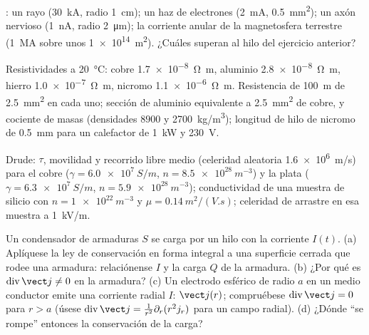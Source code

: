 \begin{exercise}[$\star$]\label{exo:b2:charges-currents-conduction:2}
: un rayo (\qty{30}{kA}, radio \qty{1}{cm}); un haz de
electrones (\qty{2}{mA}, \qty{0.5}{mm^2}); un axón nervioso (\qty{1}{nA}, radio
\qty{2}{\micro m}); la corriente anular de la magnetosfera terrestre (\qty{1}{MA} sobre
unos \qty{1e14}{m^2}). ¿Cuáles superan al hilo del ejercicio anterior?
\end{exercise}

\begin{exercise}[$\star$]\label{exo:b2:charges-currents-conduction:3}
Resistividades a \qty{20}{\degreeCelsius}: cobre \qty{1.7e-8}{\ohm.m}, aluminio
\qty{2.8e-8}{\ohm.m}, hierro \qty{1.0e-7}{\ohm.m}, nicromo \qty{1.1e-6}{\ohm.m}.
Resistencia de \qty{100}{m} de \qty{2.5}{mm^2} en cada uno; sección de aluminio
equivalente a \qty{2.5}{mm^2} de cobre, y cociente de masas (densidades
$8900$ y \qty{2700}{kg/m^3}); longitud de hilo de nicromo de \qty{0.5}{mm} para un
calefactor de \qty{1}{kW} y \qty{230}{V}.
\end{exercise}

\begin{exercise}[$\star$]\label{exo:b2:charges-currents-conduction:4}
Drude: $\tau$, movilidad y recorrido libre medio (celeridad aleatoria \qty{1.6e6}{m/s})
para el cobre ($\gamma = \qty{6.0e7}{S/m}$, $n = \qty{8.5e28}{m^{-3}}$) y la plata
($\gamma = \qty{6.3e7}{S/m}$, $n = \qty{5.9e28}{m^{-3}}$); conductividad de una
muestra de silicio con $n = \qty{1e22}{m^{-3}}$ y $\mu = \qty{0.14}{m^2/(V.s)}$;
celeridad de arrastre en esa muestra a \qty{1}{kV/m}.
\end{exercise}

\begin{exercise}[$\star\star$]\label{exo:b2:charges-currents-conduction:5}
Un condensador de armaduras $S$ se carga por un hilo con la corriente
$I(t)$. (a) Aplíquese la ley de conservación en forma integral a una
superficie cerrada que rodee una armadura: relaciónense $I$ y la carga $Q$ de la armadura. (b) ¿Por qué es $\operatorname{div}\vect j \ne 0$
en la armadura? (c) Un electrodo esférico de radio $a$ en un medio
conductor emite una corriente radial $I$: $\vect j(r)$; compruébese $\operatorname{div}
\vect j = 0$ para $r > a$ (úsese $\operatorname{div}\vect j = \frac1{r^2}\partial_r(r^2j_r)$
para un campo radial). (d) ¿Dónde ``se rompe'' entonces la conservación de
la carga?
\end{exercise}

